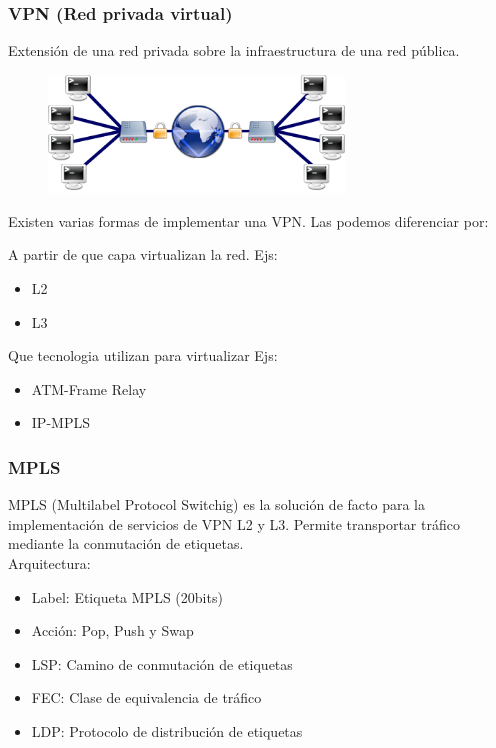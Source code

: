\documentclass{beamer}
\begin{document}
\begin{frame}
\frametitle{VPN (Red privada virtual)} 

Extensión de una red privada sobre la infraestructura de una red pública.
	\begin{figure}[H]
		\raggedright
		\includegraphics[width=0.7\textwidth, center]{imagenes/vpn.png}
	\end{figure}
Existen varias formas de implementar una VPN.
Las podemos diferenciar por:

A partir de que capa virtualizan la red.
Ejs:
\begin{itemize}
\item L2
\item L3
\end{itemize}

Que tecnologia utilizan para virtualizar
Ejs:
\begin{itemize}
\item ATM-Frame Relay
\item IP-MPLS 
\end{itemize}

\end{frame}

\begin{frame}
\frametitle{MPLS} 

MPLS (Multilabel Protocol Switchig) es la soluci\'on de facto para la implementaci\'on de servicios de VPN L2 y L3. Permite transportar tr\'afico mediante la conmutaci\'on de etiquetas.\\

\vspace{0.4cm}
\pause
Arquitectura:\\

\begin{itemize}
\item Label: Etiqueta MPLS (20bits)
\item Acci\'on: Pop, Push y Swap
\item LSP: Camino de conmutaci\'on de etiquetas
\item FEC: Clase de equivalencia de tr\'afico
\item LDP: Protocolo de distribución de etiquetas
\end{itemize}

\end{frame}
\end{document}
